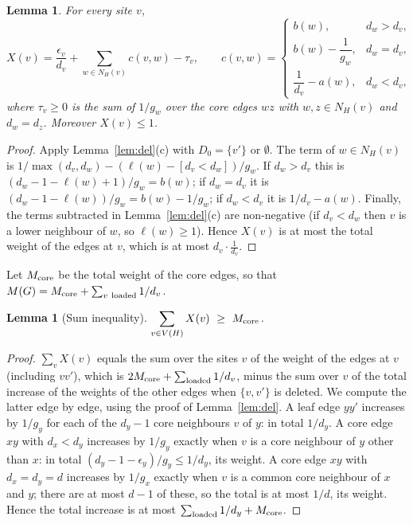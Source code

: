 \documentclass[11pt,a4paper]{article}
\newtheorem{lemma}[theorem]{Lemma}
\theoremstyle{definition}
\theoremstyle{remark}
\numberwithin{equation}{section}
\begin{document}
\begin{lemma}\label{lem:X}
For every site $v$,
\[
 X(v)=\frac{\epsilon_v}{d_v}+\sum_{w\in N_H(v)}c(v,w)-\tau_v,\qquad
 c(v,w)=\begin{cases} b(w),& d_w>d_v,\\[2pt] b(w)-\dfrac1{g_w},& d_w=d_v,\\[6pt]
 \dfrac1{d_v}-a(w),& d_w<d_v,\end{cases}
\]
where $\tau_v\ge0$ is the sum of $1/g_w$ over the core edges $wz$ with
$w,z\in N_H(v)$ and $d_w=d_z$. Moreover $X(v)\le1$.
\end{lemma}
\begin{proof}
Apply Lemma~\ref{lem:del}(c) with $D_0=\{v'\}$ or $\emptyset$. The term of
$w\in N_H(v)$ is $1/\max(d_v,d_w)-(\ell(w)-[d_v<d_w])/g_w$. If $d_w>d_v$ this is
$(d_w-1-\ell(w)+1)/g_w=b(w)$; if $d_w=d_v$ it is $(d_w-1-\ell(w))/g_w=b(w)-1/g_w$;
if $d_w<d_v$ it is $1/d_v-a(w)$. Finally, the terms subtracted in
Lemma~\ref{lem:del}(c) are non-negative (if $d_v<d_w$ then $v$ is a lower neighbour
of $w$, so $\ell(w)\ge1$). Hence $X(v)$ is at most the total weight of the edges at
$v$, which is at most $d_v\cdot\frac1{d_v}$.
\end{proof}

Let $M_{\rm core}$ be the total weight of the core edges, so that
$M(G)=M_{\rm core}+\sum_{v\ \rm loaded}1/d_v$.

\begin{lemma}[Sum inequality]\label{lem:sum}
$\displaystyle\sum_{v\in V(H)}X(v)\ \ge\ M_{\rm core}$.
\end{lemma}
\begin{proof}
$\sum_vX(v)$ equals the sum over the sites $v$ of the weight of the edges at $v$
(including $vv'$), which is $2M_{\rm core}+\sum_{\rm loaded}1/d_v$, minus the sum
over $v$ of the total increase of the weights of the other edges when
$\{v,v'\}$ is deleted. We compute the latter edge by edge, using the proof of
Lemma~\ref{lem:del}. A leaf edge $yy'$ increases by $1/g_y$ for each of the
$d_y-1$ core neighbours $v$ of $y$: in total $1/d_y$. A core edge $xy$ with
$d_x<d_y$ increases by $1/g_y$ exactly when $v$ is a core neighbour of $y$ other
than $x$: in total $(d_y-1-\epsilon_y)/g_y\le 1/d_y$, its weight. A core edge $xy$ with
$d_x=d_y=d$ increases by $1/g_x$ exactly when $v$ is a common core neighbour of
$x$ and $y$; there are at most $d-1$ of these, so the total is at most $1/d$, its
weight. Hence the total increase is at most
$\sum_{\rm loaded}1/d_y+M_{\rm core}$.
\end{proof}
\end{document}
